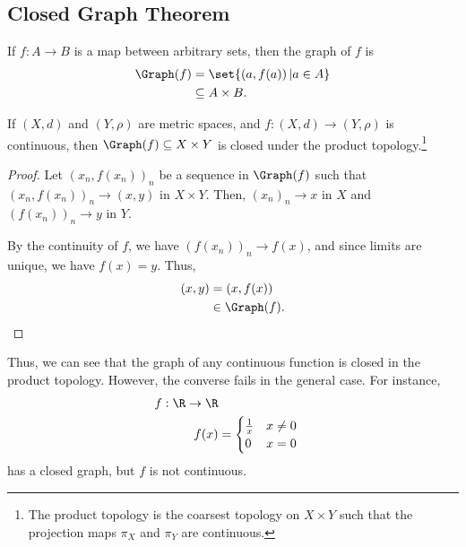 \documentclass[10pt]{mypackage}
\begin{document}
  \subsection{Closed Graph Theorem}%
  \begin{definition}
    If $f: A\rightarrow B$ is a map between arbitrary sets, then the graph of $f$ is
    \begin{align*}
      \Graph(f) &= \set{\left(a,f(a)\right)| a\in A}\\
                &\subseteq A\times B.
    \end{align*}
  \end{definition}
  \begin{proposition}
    If $\left(X,d\right)$ and $\left(Y,\rho\right)$ are metric spaces, and $f: \left(X,d\right)\rightarrow \left(Y,\rho\right)$ is continuous, then $\Graph(f) \subseteq X\times Y$ is closed under the product topology.\footnote{The product topology is the coarsest topology on $X\times Y$ such that the projection maps $\pi_X$ and $\pi_Y$ are continuous.}
  \end{proposition}
  \begin{proof}
    Let $\left(x_n,f\left(x_n\right)\right)_n$ be a sequence in $\Graph(f)$ such that $\left(x_n,f\left(x_n\right)\right)_n\rightarrow \left(x,y\right)$ in $X\times Y$. Then, $\left(x_n\right)_n \rightarrow x$ in $X$ and $\left(f\left(x_n\right)\right)_n\rightarrow y$ in $Y$.\newline

    By the continuity of $f$, we have $\left(f\left(x_n\right)\right)_n\rightarrow f(x)$, and since limits are unique, we have $f(x) = y$. Thus,
    \begin{align*}
      \left(x,y\right) &= \left(x,f(x)\right)\\
                       &\in \Graph(f).
    \end{align*}
  \end{proof}
  Thus, we can see that the graph of any continuous function is closed in the product topology. However, the converse fails in the general case. For instance,
  \begin{align*}
    f: \R\rightarrow \R\\
    f(x) &= \begin{cases}
      \frac{1}{x} & x\neq 0\\
      0 & x = 0
    \end{cases}
  \end{align*}
  has a closed graph, but $f$ is not continuous.\newline
\end{document}
